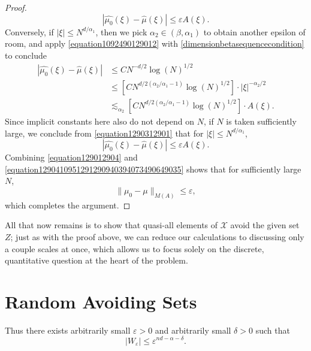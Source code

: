 \documentclass[12pt,reqno]{article}
\numberwithin{equation}{section}
\begin{document}
\begin{proof}
    \begin{equation} \label{equation129012904}
        |\widehat{\mu_0}(\xi) - \widehat{\mu}(\xi)| \leq \varepsilon A(\xi).
    \end{equation}
    Conversely, if $|\xi| \leq N^{d/\alpha_1}$, then we pick $\alpha_2 \in (\beta,\alpha_1)$ to obtain another epsilon of room, and apply \eqref{equation1092490129012} with \eqref{dimensionbetasequencecondition} to conclude
    \begin{equation} \label{equation1290312901}
    \begin{split}
        |\widehat{\mu_0}(\xi) - \widehat{\mu}(\xi)| &\leq C N^{-d/2} \log(N)^{1/2}\\
        &\leq [C N^{d/2(\alpha_2/\alpha_1 - 1)} \log(N)^{1/2}] \cdot |\xi|^{-\alpha_2/2}\\
        &\lesssim_{\alpha_2} [C N^{d/2(\alpha_2/\alpha_1 - 1)} \log(N)^{1/2}] \cdot A(\xi).
    \end{split}
    \end{equation}
    Since implicit constants here also do not depend on $N$, if $N$ is taken sufficiently large, we conclude from \eqref{equation1290312901} that for $|\xi| \leq N^{d/\alpha_1}$,
    \begin{equation} \label{equation1290410951291290940394073490649035}
        |\widehat{\mu_0}(\xi) - \widehat{\mu}(\xi)| \leq \varepsilon A(\xi).
    \end{equation}
    Combining \eqref{equation129012904} and \eqref{equation1290410951291290940394073490649035} shows that for sufficiently large $N$,
    \[ \| \mu_0 - \mu \|_{M(A)} \leq \varepsilon, \]
    which completes the argument.
\end{proof}

All that now remains is to show that quasi-all elements of $\mathcal{X}$ avoid the given set $Z$; just as with the proof above, we can reduce our calculations to discussing only a couple scales at once, which allows us to focus solely on the discrete, quantitative question at the heart of the problem.

\section{Random Avoiding Sets}


%
Thus there exists arbitrarily small $\varepsilon > 0$ and arbitrarily small $\delta > 0$ such that
%
\[ |W_\varepsilon| \leq \varepsilon^{nd - \alpha - \delta}. \]
\end{document}
